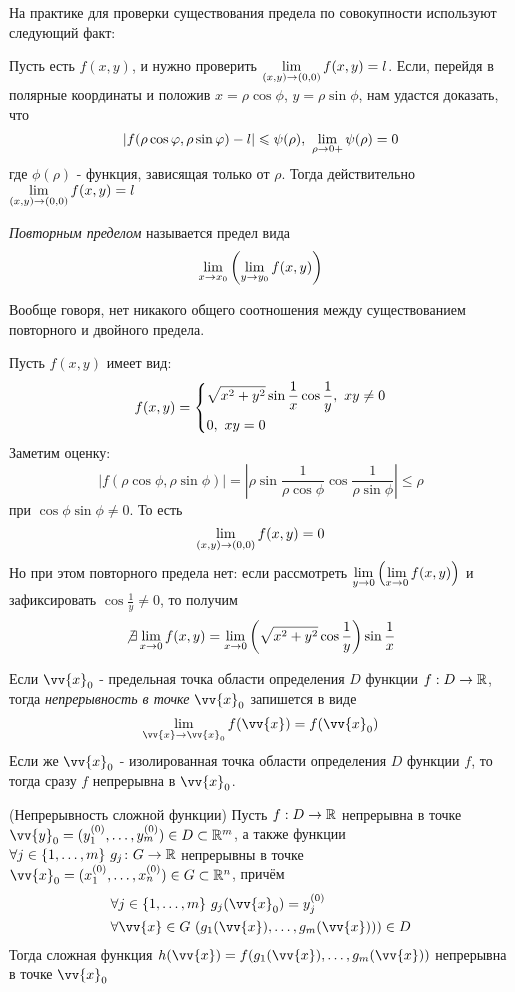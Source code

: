\begin{addition}
	На практике для проверки существования предела по совокупности используют следующий факт:
	
	Пусть есть $f(x, y)$, и нужно проверить $\lim\limits_{(x, y) \to (0, 0)} f(x, y) = l$. Если, перейдя в полярные координаты и положив $x = \rho \cos \phi$, $y = \rho \sin \phi$, нам удастся доказать, что
	\[
		|f(\rho \cos\varphi, \rho \sin\varphi) - l| \leqslant \psi(\rho),\ \lim\limits_{\rho \to 0+} \psi(\rho) = 0
	\]
	где $\phi(\rho)$ - функция, зависящая только от $\rho$. Тогда действительно $\lim\limits_{(x, y) \to (0, 0)} f(x, y) = l$
\end{addition}

\begin{definition}
	\textit{Повторным пределом} называется предел вида
	\[
		\lim\limits_{x \to x_0} \left(\lim\limits_{y \to y_0} f(x, y)\right)
	\]
\end{definition}

\begin{note}
	Вообще говоря, нет никакого общего соотношения между существованием повторного и двойного предела.
\end{note}

\begin{example}
	Пусть $f(x, y)$ имеет вид:
	\[
		f(x, y) = \System{
			&{\sqrt{x^2 + y^2} \sin \frac{1}{x} \cos \frac{1}{y}},\ xy \neq 0
			\\
			&{0,\ xy = 0}
		}
	\]
	Заметим оценку:
	\[
		|f(\rho\cos\phi, \rho\sin\phi)| =  \left|\rho\sin\frac{1}{\rho\cos\phi}\cos\frac{1}{\rho\sin\phi}\right| \le \rho
	\]
	при $\cos\phi\sin\phi \neq 0$. То есть
	\[
		\lim\limits_{(x, y) \to (0, 0)} f(x, y) = 0
	\]
	Но при этом повторного предела нет: если рассмотреть $\lim\limits_{y \to 0} \left(\lim\limits_{x \to 0} f(x, y)\right)$ и зафиксировать $\cos \frac{1}{y} \neq 0$, то получим
	\[
		\not\exists \lim\limits_{x \to 0} f(x, y) = \lim\limits_{x \to 0} \left(\sqrt{x^2 + y^2} \cos\frac{1}{y}\right)\sin\frac{1}{x}
	\]
\end{example}

\begin{definition}
	Если $\vv{x}_0$ - предельная точка области определения $D$ функции $f: D \to \mathbb{R}$, тогда \textit{непрерывность в точке} $\vv{x}_0$ запишется в виде
	\[
		\liml_{\vv{x} \to \vv{x}_0} f(\vv{x}) = f(\vv{x}_0)
	\]
	Если же $\vv{x}_0$ - изолированная точка области определения $D$ функции $f$, то тогда сразу $f$ непрерывна в $\vv{x}_0$.
\end{definition}

\begin{theorem} (Непрерывность сложной функции)
	Пусть $f: D \to \mathbb{R}$ непрерывна в точке $\vv{y}_0 = (y_1^{(0)}, \ldots, y_m^{(0)}) \in D \subset \R^m$, а также функции $\forall j \in \{1, \ldots, m\}\ g_j \colon G \to \mathbb{R}$ непрерывны в точке $\vv{x}_0 = (x_1^{(0)}, \ldots, x_n^{(0)}) \in G \subset \R^n$, причём
	\begin{align*}
		&{\forall j \in \range{m}\ g_j(\vv{x}_0) = y_j^{(0)}}
		\\
		&{\forall \vv{x} \in G\ (g_1(\vv{x}), \ldots, g_m(\vv{x}))) \in D}
	\end{align*}
	Тогда сложная функция $h(\vv{x}) = f(g_1(\vv{x}), \ldots, g_m(\vv{x}))$ непрерывна в точке $\vv{x}_0$
\end{theorem}

